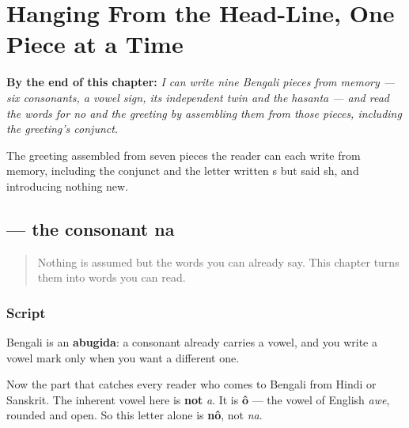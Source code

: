 
\chapter{Hanging From the Head-Line, One Piece at a Time}
\label{ch:bn-script-first}

\begin{chapteropening}
\textbf{By the end of this chapter:} \emph{I can write nine Bengali pieces from memory — six consonants, a vowel sign, its independent twin and the hasanta — and read the words for no and the greeting by assembling them from those pieces, including the greeting's conjunct.}

The greeting assembled from seven pieces the reader can each write from memory, including the conjunct and the letter written s but said sh, and introducing nothing new.
\end{chapteropening}

\section[nô]{ — the consonant na}

\label{lesson:BN-W01-na}



\begin{quote}
Nothing is assumed but the words you can already say. This chapter turns them into words you can read.
\end{quote}

\subsection*{Script}
Bengali is an \textbf{abugida}: a consonant already carries a vowel, and you write a vowel mark only when you want a different one.

\begin{quote}
\end{quote}

Now the part that catches every reader who comes to Bengali from Hindi or Sanskrit. The inherent vowel here is \textbf{not} \emph{a}. It is \textbf{ô} — the vowel of English \emph{awe}, rounded and open. So this letter alone is \textbf{nô}, not \emph{na}.

